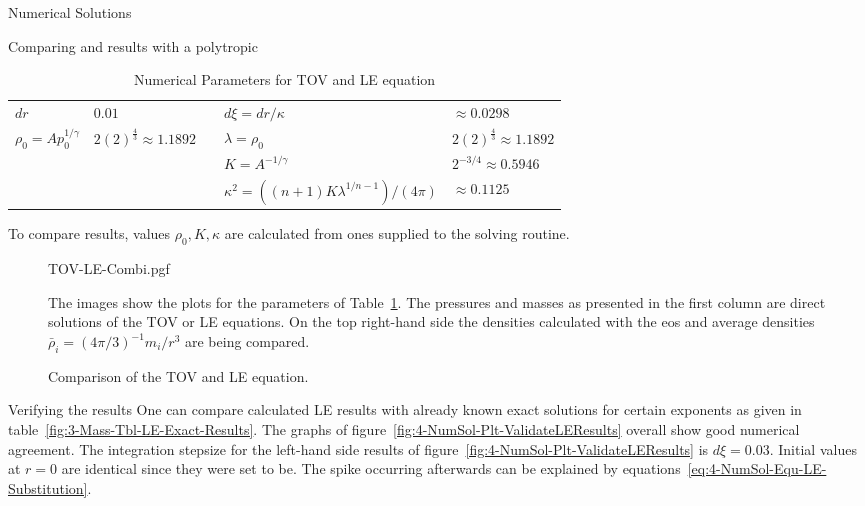\begin{section}{Numerical Solutions}
\begin{subsection}{Comparing \texorpdfstring{}{TOV} and \texorpdfstring{}{LE} results with a polytropic \texorpdfstring{}{EoS}}
\begin{table}[H]
{\begin{tabular}{@{}llcll@{}}
		$dr$ & $0.01$ && $d\xi=dr/\kappa$ & $\approx0.0298$\\
		\cmidrule{1-2} \cmidrule{4-5}
		$\rho_0=Ap_0^{1/\gamma}$ & $2(2)^{\frac{4}{3}}\approx1.1892$ && $\lambda=\rho_0$ & $2(2)^{\frac{4}{3}}\approx1.1892$\\
		&&& $K=A^{-1/\gamma}$ & $2^{-3/4}\approx0.5946$\\
		&&& $\kappa^2=((n+1)K\lambda^{1/n-1})/(4\pi)$ & $\approx0.1125$\\
		\bottomrule
	\end{tabular}
	}
	\caption[Numerical Parameters for  and LE equation]{Numerical Parameters for \ac{TOV} and \ac{LE} equation}
	\label{tab:4-NumSol-Tbl-TOVParameters}
	\small
	To compare results, values $\rho_0,K,\kappa$ are calculated from ones supplied to the solving routine.
\end{table}%
\begin{figure}[H]
	{\centering
	{TOV-LE-Combi.pgf}
	}%
	\caption[Comparison of the  and  equation]{Comparison of the \ac{TOV} and \ac{LE} equation.}
	\label{fig:4-NumSol-Plt-TOVEqEasyEOS}
	\small
	The images show the plots for the parameters of Table~\ref{tab:4-NumSol-Tbl-TOVParameters}.
	The pressures and masses as presented in the first column are direct solutions of the \ac{TOV} or \ac{LE} equations.
	On the top right-hand side the densities calculated with the \ac{eos} and average densities $\bar{\rho}_i=(4\pi/3)^{-1}m_i/r^3$ are being compared.
\end{figure}
\end{subsection}
%
%
\begin{subsection}{Verifying the results}
\label{subsec:4-NumSol-Sec-Verifiying-the-results}
One can compare calculated \ac{LE} results with already known exact  solutions for certain exponents as given in table~\ref{fig:3-Mass-Tbl-LE-Exact-Results}.
The graphs of figure~\ref{fig:4-NumSol-Plt-ValidateLEResults} overall show good numerical agreement.
The integration stepsize for the left-hand side results of figure~\ref{fig:4-NumSol-Plt-ValidateLEResults} is $d\xi=0.03$.
Initial values at $r=0$ are identical since they were set to be.
The spike occurring afterwards can be explained by equations~\eqref{eq:4-NumSol-Equ-LE-Substitution}.

\end{subsection}
\end{section}
